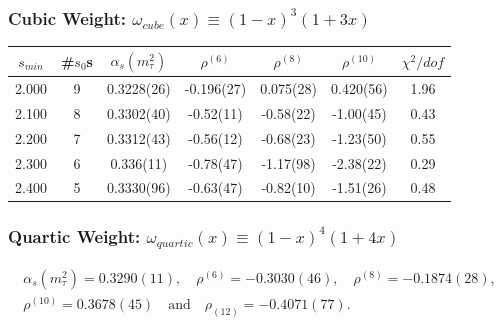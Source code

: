 \documentclass{beamer}
\begin{document}
\begin{frame}
  \frametitle{Cubic Weight: \(\omega_{cube}(x) \equiv (1-x)^3(1+3x)\)}
  \begin{tabular}{ccccccc}
    \toprule
    \(s_{min}\) & \#\(s_0\)s & \(\alpha_s(m_\tau^2)\) & \(\rho^{(6)}\) & \(\rho^{(8)}\) & \(\rho^{(10)}\) & \(\chi^2/dof\)  \\
    \midrule
    2.000 & 9 & 0.3228(26) & -0.196(27) & 0.075(28) & 0.420(56) & 1.96 \\
    \rowcolor{primary}
    2.100 & 8 & 0.3302(40) & -0.52(11) & -0.58(22) & -1.00(45) & 0.43 \\
    2.200 & 7 & 0.3312(43) & -0.56(12) & -0.68(23) & -1.23(50) & 0.55 \\
    2.300 & 6 & 0.336(11) & -0.78(47) & -1.17(98) & -2.38(22) & 0.29 \\
    2.400 & 5 & 0.3330(96) & -0.63(47) & -0.82(10) & -1.51(26) & 0.48 \\
    \bottomrule
  \end{tabular}
\end{frame}

\begin{frame}
  \frametitle{Quartic Weight:  \( \omega_{quartic}(x) \equiv (1-x)^4(1+4x)\)}
  \begin{small}
    \begin{ceqn}
      \begin{equation}
        \begin{split}
          \alpha_s(m_\tau^2) = 0.3290(11), \quad \rho^{(6)}=-0.3030(46), \quad \rho^{(8)}=-0.1874(28), \\
          \rho^{(10)} = 0.3678(45) \quad \text{and} \quad \rho_{(12)}=-0.4071(77).
        \end{split}
      \end{equation}
    \end{ceqn}
  \end{small}
\end{frame}
\end{document}
